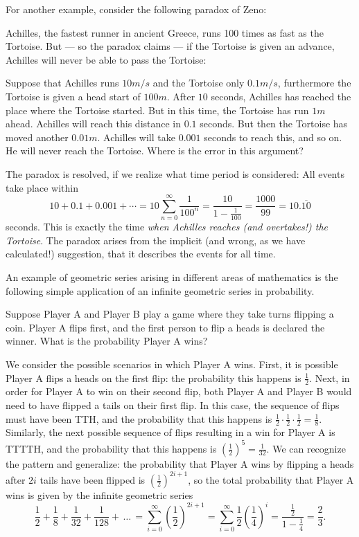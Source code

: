For another example, consider the following paradox of Zeno:

Achilles, the fastest runner in ancient Greece, runs 100 times as
fast as the Tortoise. But --- so the paradox claims --- if the
Tortoise is given an advance, Achilles will never be able to pass
the Tortoise:

Suppose that Achilles runs
$10 m/s$ and the Tortoise only $0.1 m/s$, furthermore the Tortoise is given
a head start of $100m$.
After $10$ seconds, Achilles has reached the place where the Tortoise
started. But in this time, the Tortoise has run $1m$ ahead. Achilles will
reach this distance in $0.1$ seconds. But then the Tortoise has moved
another $0.01m$. Achilles will take $0.001$ seconds to reach this, and so
on. He will never reach the Tortoise. Where is the error in this argument?

The paradox is resolved, if we realize what time period is considered:
All events take place within
\[
10+0.1+0.001+\cdots=10\sum_{n=0}^\infty
\frac{1}{100^n}=\frac{10}{1-\frac{1}{100}}=\frac{1000}{99}=10.\overline{10}
\]
seconds. This is exactly the time {\em when Achilles reaches (and
overtakes!) the Tortoise}. The paradox arises from the implicit
(and wrong, as we have calculated!)
suggestion, that it describes the events for all time.
\bigskip

An example of geometric series arising in different areas of mathematics is
the following simple application of an infinite geometric series in probability.

Suppose Player A and Player B play a game where they take turns flipping a coin.
Player A flips first, and the first person to flip a heads is declared the winner.
What is the probability Player A wins?

We consider the possible scenarios in which Player A wins.
First, it is possible Player A flips a heads on the first flip: the probability this happens is $\frac{1}{2}$.
Next, in order for Player A to win on their second flip, both Player A and Player B would need to have flipped a tails on their first flip.
In this case, the sequence of flips must have been TTH, and the probability that this happens is $\frac{1}{2} \cdot \frac{1}{2} \cdot \frac{1}{2} = \frac{1}{8}$.
Similarly, the next possible sequence of flips resulting in a win for Player A is TTTTH, and the probability that this happens is $\left( \frac{1}{2} \right)^5 = \frac{1}{32}$.
We can recognize the pattern and generalize: the probability that Player A wins by flipping a heads after $2i$ tails have been flipped is $\left( \frac{1}{2} \right)^{2i+1}$, so the total probability that Player A wins is given by the infinite geometric series 
\[\frac{1}{2} + \frac{1}{8} + \frac{1}{32} + \frac{1}{128} + \, \dots \,  = \sum_{i=0}^\infty \left( \frac{1}{2} \right)^{2i+1} = \sum_{i=0}^\infty \frac{1}{2} \left( \frac{1}{4} \right)^i = \frac{\frac{1}{2}}{1-\frac{1}{4}} = \frac{2}{3}.
\]

